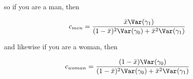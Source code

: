 so if you are a man, then 

\begin{align*}
	c_{men} =  \frac{\bar{x}\Var(\gamma_1)}{(1-\bar{x})^2\Var(\gamma_0) + \bar{x}^2\Var(\gamma_1)}
\end{align*}

and likewise if you are a woman, then

\begin{align*}
	c_{woman} = \frac{(1-\bar{x})\Var(\gamma_0)}{(1-\bar{x})^2\Var(\gamma_0) + \bar{x}^2\Var(\gamma_1)}
\end{align*}







